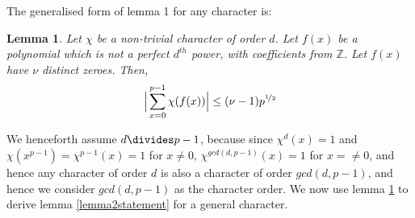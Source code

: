 \documentclass{report}
\newtheorem{lemma}{Lemma}
\begin{document}
The generalised form of lemma 1 for any character is:
\begin{lemma} \label{lemma4}
\cite{schmidt}Let $\chi$ be a non-trivial character of order $d$. Let $f(x)$ be a polynomial which is not a perfect $d^{th}$ power, with coefficients from $\mathbb{Z}$. Let $f(x)$ have $\nu$ distinct zeroes. Then,
$$\Big\lvert\sum\limits_{x=0}^{p-1}\chi(f(x))\Big\rvert\leq (\nu -1)p^{\nicefrac{1}{2}}$$
\end{lemma}
We henceforth assume $d \divides p-1$, because since $\chi^{d}(x)=1$ and $\chi(x^{p-1})=\chi^{p-1}(x)=1$ for $x\neq0$, $\chi^{gcd(d,p-1)}(x)=1$ for $x=\neq0$, and hence any character of order $d$ is also a character of order $gcd(d,p-1)$, and hence we consider $gcd(d,p-1)$ as the character order.
We now use lemma \ref{lemma4} to derive lemma \ref{lemma2statement} for a general character.
\end{document}
